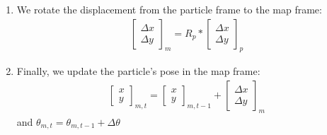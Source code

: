 \documentclass[11pt]{article}
\begin{document}
\begin{enumerate}
\item We rotate the displacement from the particle frame to the map frame:
\begin{align*}
\begin{bmatrix}
\Delta x \\
\Delta y
\end{bmatrix}_{m} = 
R_{p} * \begin{bmatrix}
\Delta x \\
\Delta y
\end{bmatrix}_{p}
\end{align*}

\item Finally, we update the particle's pose in the map frame:
\begin{align*}
\begin{bmatrix}
x \\
y
\end{bmatrix}_{m,t} = 
\begin{bmatrix}
x \\
y
\end{bmatrix}_{m,t-1} +
\begin{bmatrix}
\Delta x \\
\Delta y
\end{bmatrix}_{m}
\end{align*}
and $\theta_{m,t} = \theta_{m,t-1} + \Delta \theta$
\end{enumerate}
\end{document}
